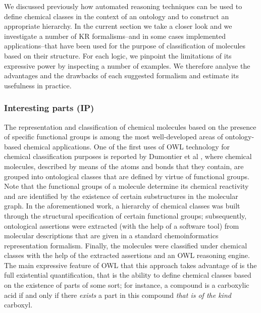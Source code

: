 \documentclass[10pt]{bmc_article}
\newenvironment{bmcformat}{\baselineskip20pt\sloppy\setboolean{publ}{false}}{\baselineskip20pt\sloppy}
\begin{document}
\begin{bmcformat}
We discussed previously how automated reasoning techniques can be used to define chemical classes in the context of an ontology and to construct an appropriate hierarchy. 
In the current section we take a closer look and we investigate a number of KR formalisms--and in some cases implemented applications--that have been used for the purpose of classification of molecules based on their structure.  For each logic, we pinpoint the limitations of its expressive power by inspecting a number of examples. 
We therefore analyse the advantages and the drawbacks of each suggested formalism and estimate its usefulness in practice.

% 


\subsubsection*{Interesting parts (IP)}


The representation and classification of chemical molecules based on the presence of specific functional groups is among the most well-developed areas of ontology-based chemical applications. One of the first uses of OWL technology for chemical classification purposes is reported by Dumontier et al \cite{dumontier2007}, where chemical molecules, described by means of the atoms and bonds that they contain, are grouped into ontological classes that are defined by virtue of functional groups. Note that the functional groups of a molecule determine its chemical reactivity and are identified by the existence of certain substructures in the molecular graph. In the aforementioned work, a hierarchy of chemical classes was built through the structural specification of certain functional groups; subsequently, ontological assertions were extracted (with the help of a software tool) from molecular descriptions that are given in a standard chemoinformatics representation formalism. Finally, the molecules were classified under chemical classes with the help of the extracted assertions and an OWL reasoning engine. The main expressive feature of OWL that this approach takes advantage of is the full existential quantification, that is the ability to define chemical classes based on the existence of parts of some sort; for instance, a compound is a carboxylic acid if and only if there \emph{exists} a part in this compound \emph{that is of the kind} carboxyl.


\end{bmcformat}
\end{document}
